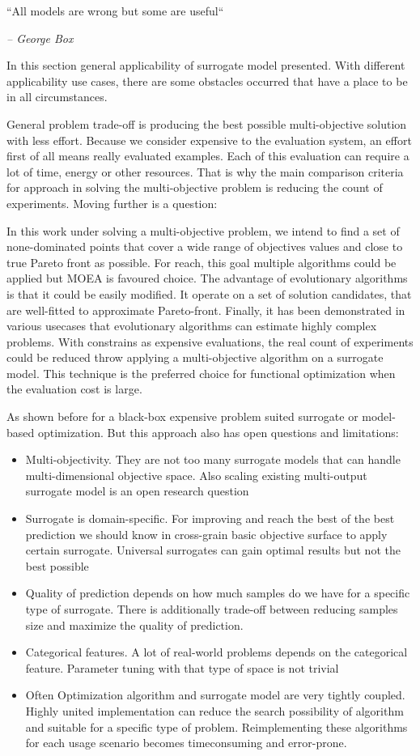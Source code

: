     \epigraph{``All models are wrong but some are useful``}{\textit{– George Box}}

     In this section general applicability of surrogate model presented. With different applicability use cases, there are some obstacles occurred that have a place to be in all circumstances.

    General problem trade-off is producing the best possible multi-objective solution with less effort. Because we consider expensive to the evaluation system, an effort first of all means really evaluated examples. Each of this evaluation can require a lot of time, energy or other resources. That is why the main comparison criteria for approach in solving the multi-objective problem is reducing the count of experiments. Moving further is a question: 

    In this work under solving a multi-objective problem, we intend to find a set of none-dominated points that cover a wide range of objectives values and close to true Pareto front as possible. For reach, this goal multiple algorithms could be applied but MOEA is favoured choice. The advantage of evolutionary algorithms is that it could be easily modified. It operate on a set of solution candidates, that are well-fitted to approximate Pareto-front. Finally, it has been demonstrated in various usecases that evolutionary algorithms can estimate highly complex problems. With constrains as expensive evaluations, the real count of experiments could be reduced throw applying a multi-objective algorithm on a surrogate model. This technique is the preferred choice for functional optimization when the evaluation cost is large.

    As shown before for a black-box expensive problem suited surrogate or model-based optimization. But this approach also has open questions and limitations:
    \begin{itemize}
        \item Multi-objectivity. They are not too many surrogate models that can handle multi-dimensional objective space. Also scaling existing multi-output surrogate model is an open research question
        \item Surrogate is domain-specific. For improving and reach the best of the best prediction we should know in cross-grain basic objective surface to apply certain surrogate. Universal surrogates can gain optimal results but not the best possible
        \item Quality of prediction depends on how much samples do we have for a specific type of surrogate. There is additionally trade-off between reducing samples size and maximize the quality of prediction.
        \item Categorical features. A lot of real-world problems depends on the categorical feature. Parameter tuning with that type of space is not trivial
        \item Often Optimization algorithm and surrogate model are very tightly coupled. Highly united implementation can reduce the search possibility of algorithm and suitable for a specific type of problem. Reimplementing these algorithms for each usage scenario becomes timeconsuming and error-prone.
    \end{itemize}

